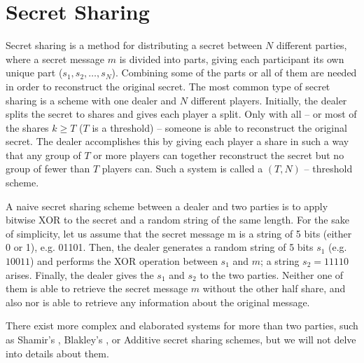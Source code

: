 \section{Secret Sharing}\label{s:secret-sharing}
Secret sharing is a method  for distributing a secret between $N$ different parties, where a secret message $m$ is divided into parts, giving each participant its own unique part ($s_1, s_2, \dots, s_N$).
Combining some of the parts or all of them are needed in order to reconstruct the original secret.
The most common type of secret sharing is a scheme with one dealer and $N$ different players.
Initially, the dealer splits the secret to shares and gives each player a split.
Only with all -- or most of the shares $k \geq T$  ($T$ is a threshold) -- someone is able to reconstruct the original secret.
The dealer accomplishes this by giving each player a share in such a way that any group of $T$ or more players can together reconstruct the secret but no group of fewer than $T$ players can.
Such a system is called a $(T, N)$ -- threshold scheme.

A naive secret sharing scheme between a dealer and two parties is to apply bitwise XOR to the secret and a random string of the same length.
For the sake of simplicity, let us assume that the secret message m is a string of 5 bits (either 0 or 1), e.g. 01101.
Then, the dealer generates a random string of 5 bits $s_1$ (e.g. $10011$) and performs the XOR operation between $s_1$ and $m$; a string $s_2 = 11110$ arises.
Finally, the dealer gives the $s_1$ and $s_2$ to the two parties.
Neither one of them is able to retrieve the secret message $m$ without the other half share, and also nor is able to retrieve any information about the original message.

There exist more complex and elaborated systems for more than two parties, such as Shamir’s \cite{shamir1979share}, Blakley’s \cite{blakley1994linear}, or Additive \cite{kim2003designs} secret sharing schemes, but we will not delve into details about them.
